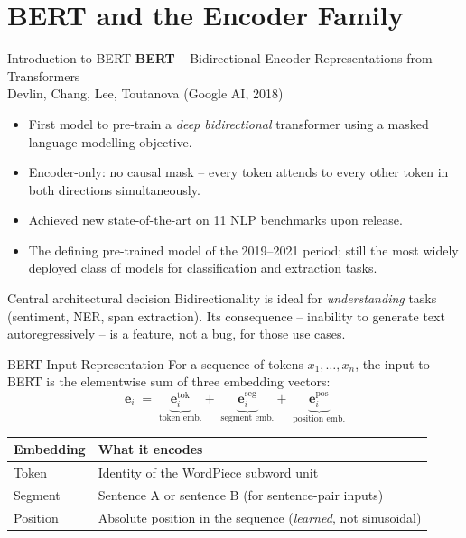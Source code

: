 \documentclass[11pt,aspectratio=169,professionalfonts]{beamer}
\begin{document}
\section{BERT and the Encoder Family}
%
\begin{frame}{Introduction to BERT}
  \textbf{BERT} -- Bidirectional Encoder Representations from Transformers\\
  Devlin, Chang, Lee, Toutanova (Google AI, 2018)
  \medskip

  \begin{itemize}
    \item First model to pre-train a \emph{deep bidirectional} transformer
          using a masked language modelling objective.
    \item Encoder-only: no causal mask -- every token attends to every
          other token in both directions simultaneously.
    \item Achieved new state-of-the-art on 11 NLP benchmarks upon release.
    \item The defining pre-trained model of the 2019--2021 period;
          still the most widely deployed class of models for
          classification and extraction tasks.
  \end{itemize}

  \begin{block}{Central architectural decision}
    Bidirectionality is ideal for \emph{understanding} tasks
    (sentiment, NER, span extraction).
    Its consequence -- inability to generate text autoregressively --
    is a feature, not a bug, for those use cases.
  \end{block}
\end{frame}
%
%
\begin{frame}{BERT Input Representation}
  For a sequence of tokens $x_1,\ldots,x_n$, the input to BERT is
  the elementwise sum of three embedding vectors:
  \[
    \mathbf{e}_i \;=\;
    \underbrace{\mathbf{e}^{\text{tok}}_i}_{\text{token emb.}}
    +\;
    \underbrace{\mathbf{e}^{\text{seg}}_i}_{\text{segment emb.}}
    +\;
    \underbrace{\mathbf{e}^{\text{pos}}_i}_{\text{position emb.}}
  \]

  \begin{center}
  \small
  \renewcommand{\arraystretch}{1.25}
  \begin{tabular}{@{}ll@{}}
    \toprule
    \textbf{Embedding} & \textbf{What it encodes}\\
    \midrule
    Token & Identity of the WordPiece subword unit\\
    Segment & Sentence A or sentence B (for sentence-pair inputs)\\
    Position & Absolute position in the sequence (\emph{learned}, not sinusoidal)\\
    \bottomrule
  \end{tabular}
  \end{center}
\end{frame}
\end{document}
